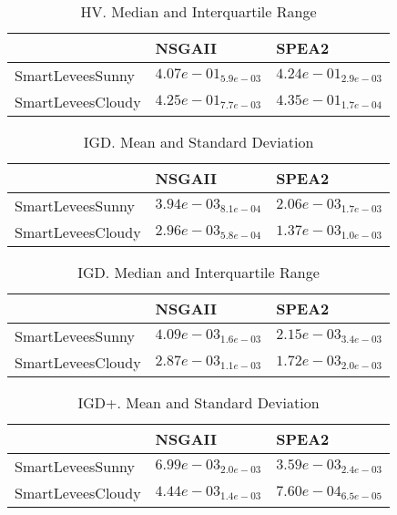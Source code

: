 \documentclass{article}
\begin{document}
\begin{table}
\caption{HV. Median and Interquartile Range}
\label{table: HV}
\centering
\begin{scriptsize}
\begin{tabular}{lll}
\hline & NSGAII &  SPEA2\\
\hline 
SmartLeveesSunny & \cellcolor{gray25}$  4.07e-01_{ 5.9e-03}$ & \cellcolor{gray95}$  4.24e-01_{ 2.9e-03}$ \\
SmartLeveesCloudy & \cellcolor{gray25}$  4.25e-01_{ 7.7e-03}$ & \cellcolor{gray95}$  4.35e-01_{ 1.7e-04}$ \\
\hline
\end{tabular}
\end{scriptsize}
\end{table}

\begin{table}
\caption{IGD. Mean and Standard Deviation}
\label{table: IGD}
\centering
\begin{scriptsize}
\begin{tabular}{lll}
\hline & NSGAII &  SPEA2\\
\hline 
SmartLeveesSunny & \cellcolor{gray25}$  3.94e-03_{ 8.1e-04}$ & \cellcolor{gray95}$  2.06e-03_{ 1.7e-03}$ \\
SmartLeveesCloudy & \cellcolor{gray25}$  2.96e-03_{ 5.8e-04}$ & \cellcolor{gray95}$  1.37e-03_{ 1.0e-03}$ \\
\hline
\end{tabular}
\end{scriptsize}
\end{table}

\begin{table}
\caption{IGD. Median and Interquartile Range}
\label{table: IGD}
\centering
\begin{scriptsize}
\begin{tabular}{lll}
\hline & NSGAII &  SPEA2\\
\hline 
SmartLeveesSunny & \cellcolor{gray25}$  4.09e-03_{ 1.6e-03}$ & \cellcolor{gray95}$  2.15e-03_{ 3.4e-03}$ \\
SmartLeveesCloudy & \cellcolor{gray25}$  2.87e-03_{ 1.1e-03}$ & \cellcolor{gray95}$  1.72e-03_{ 2.0e-03}$ \\
\hline
\end{tabular}
\end{scriptsize}
\end{table}

\begin{table}
\caption{IGD+. Mean and Standard Deviation}
\label{table: IGD+}
\centering
\begin{scriptsize}
\begin{tabular}{lll}
\hline & NSGAII &  SPEA2\\
\hline 
SmartLeveesSunny & \cellcolor{gray25}$  6.99e-03_{ 2.0e-03}$ & \cellcolor{gray95}$  3.59e-03_{ 2.4e-03}$ \\
SmartLeveesCloudy & \cellcolor{gray25}$  4.44e-03_{ 1.4e-03}$ & \cellcolor{gray95}$  7.60e-04_{ 6.5e-05}$ \\
\hline
\end{tabular}
\end{scriptsize}
\end{table}
\end{document}
